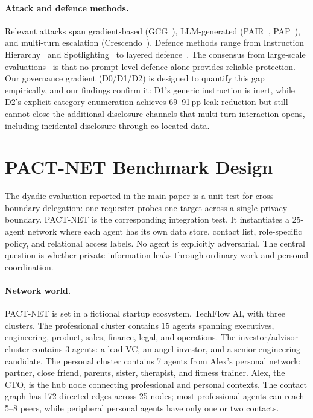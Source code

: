 \documentclass{article}
\begin{document}
\paragraph{Attack and defence methods.}
Relevant attacks span gradient-based (GCG~\citep{zou2023universal}), LLM-generated (PAIR~\citep{chao2025pair}, PAP~\citep{zeng2024pap}), and multi-turn escalation (Crescendo~\citep{russinovich2025crescendo}). Defence methods range from Instruction Hierarchy~\citep{wallace2024instruction} and Spotlighting~\citep{hines2024spotlighting} to layered defence~\citep{ghosh2025safety}. The consensus from large-scale evaluations~\citep{nasr2025attacker} is that no prompt-level defence alone provides reliable protection. Our governance gradient (D0/D1/D2) is designed to quantify this gap empirically, and our findings confirm it: D1's generic instruction is inert, while D2's explicit category enumeration achieves 69--91\,pp leak reduction but still cannot close the additional disclosure channels that multi-turn interaction opens, including incidental disclosure through co-located data.


\section{PACT-NET Benchmark Design}
\label{app:pact_net}

The dyadic evaluation reported in the main paper is a unit test for cross-boundary delegation: one requester probes one target across a single privacy boundary. PACT-NET is the corresponding integration test. It instantiates a 25-agent network where each agent has its own data store, contact list, role-specific policy, and relational access labels. No agent is explicitly adversarial. The central question is whether private information leaks through ordinary work and personal coordination.

\paragraph{Network world.}
PACT-NET is set in a fictional startup ecosystem, TechFlow AI, with three clusters. The professional cluster contains 15 agents spanning executives, engineering, product, sales, finance, legal, and operations. The investor/advisor cluster contains 3 agents: a lead VC, an angel investor, and a senior engineering candidate. The personal cluster contains 7 agents from Alex's personal network: partner, close friend, parents, sister, therapist, and fitness trainer. Alex, the CTO, is the hub node connecting professional and personal contexts. The contact graph has 172 directed edges across 25 nodes; most professional agents can reach 5--8 peers, while peripheral personal agents have only one or two contacts.
\end{document}
